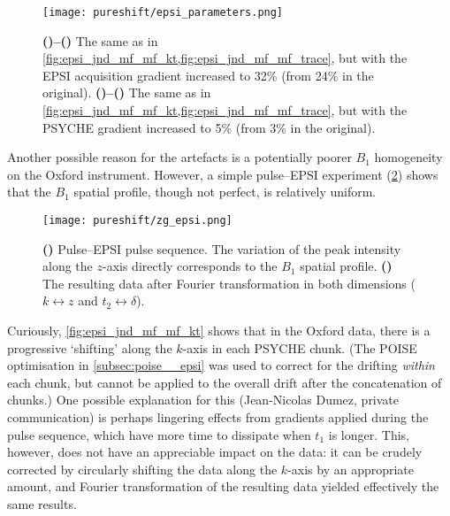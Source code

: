 \begin{figure}[htb]
    \centering
    \texttt{[image: pureshift/epsi\_parameters.png]}%
    {\label{fig:epsi_parameters_moreepsi_kt}}%
    {\label{fig:epsi_parameters_moreepsi_trace}}%
    {\label{fig:epsi_parameters_morepsyche_kt}}%
    {\label{fig:epsi_parameters_morepsyche_trace}}%
    \caption[Effects of varying acquisition parameters on ultrafast PSYCHE-iDOSY spectra]{
        \textbf{()--()} The same as in \cref{fig:epsi_jnd_mf_mf_kt,fig:epsi_jnd_mf_mf_trace}, but with the EPSI acquisition gradient increased to 32\% (from 24\% in the original).
        \textbf{()--()} The same as in \cref{fig:epsi_jnd_mf_mf_kt,fig:epsi_jnd_mf_mf_trace}, but with the PSYCHE gradient increased to 5\% (from 3\% in the original).        
    }
    \label{fig:epsi_parameters}
\end{figure}

Another possible reason for the artefacts is a potentially poorer $B_1$ homogeneity on the Oxford instrument.
However, a simple pulse--EPSI experiment (\cref{fig:zg_epsi}) shows that the $B_1$ spatial profile, though not perfect, is relatively uniform.

\begin{figure}[htb]
    \centering
    \texttt{[image: pureshift/zg\_epsi.png]}%
    {\label{fig:zg_epsi_pulseq}}%
    {\label{fig:zg_epsi_spec}}%
    \caption[Pulse--EPSI pulse sequence and data]{
        \textbf{()} Pulse--EPSI pulse sequence. The variation of the peak intensity along the $z$-axis directly corresponds to the $B_1$ spatial profile.
        \textbf{()} The resulting data after Fourier transformation in both dimensions ($k \leftrightarrow z$ and $t_2 \leftrightarrow \delta$).
    }
    \label{fig:zg_epsi}
\end{figure}

Curiously, \cref{fig:epsi_jnd_mf_mf_kt} shows that in the Oxford data, there is a progressive `shifting' along the $k$-axis in each PSYCHE chunk.
(The POISE optimisation in \cref{subsec:poise__epsi} was used to correct for the drifting \textit{within} each chunk, but cannot be applied to the overall drift after the concatenation of chunks.)
One possible explanation for this (Jean-Nicolas Dumez, private communication) is perhaps lingering effects from gradients applied during the pulse sequence, which have more time to dissipate when $t_1$ is longer.
This, however, does not have an appreciable impact on the data: it can be crudely corrected by circularly shifting the data along the $k$-axis by an appropriate amount, and Fourier transformation of the resulting data yielded effectively the same results.

